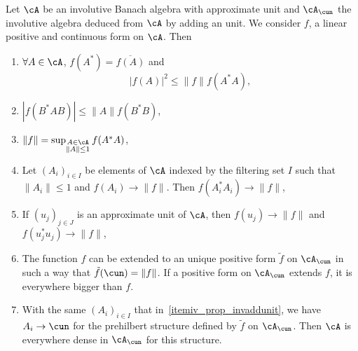 \begin{proposition}
	Let $\cA$ be an involutive Banach algebra with approximate unit and $\cA_{\cun}$ the involutive algebra deduced from $\cA$ by adding an unit. We consider $f$, a linear positive and continuous form on $\cA$. Then
	\begin{enumerate}
		\item \label{itemi_prop_invaddunit} $\forall A\in \cA$, $f(A^*)=\overline{ f(A) }$ and
		      \[
			      | f(A) |^2\leq \| f \|f(A^*A),
		      \]
		\item \label{itemii_prop_invaddunit} $| f(B^*AB) |\leq\| A \|f(B^*B)$,
		\item \label{itemiii_prop_invaddunit} $\| f \|=\sup_{\substack{A\in\cA\\\| A \|\leq1} } f(A^*A)$,
		\item \label{itemiv_prop_invaddunit} Let $(A_i)_{i\in I}$ be elements of $\cA$ indexed by the filtering set $I$ such that $\| A_i \|\leq 1$ and $f(A_i)\to\| f \|$. Then $f(A^*_iA_i)\to\| f \|$,
		\item \label{itemv_prop_invaddunit} If $(u_j)_{j\in J}$ is an approximate unit of $\cA$, then $f(u_j)\to \| f \|$ and $f(u_j^*u_j)\to\| f \|$,
		\item \label{itemvi_prop_invaddunit} The function $f$ can be extended to an unique positive form $\tilde f$ on $\cA_{\cun}$ in such a way that $\tilde f(\cun)=\| f \|$. If a positive form on $\cA_{\cun}$ extends $f$, it is everywhere bigger than $f$.
		\item \label{itemvii_prop_invaddunit} With the same $(A_i)_{i\in I}$ that in~\ref{itemiv_prop_invaddunit}, we have $A_i\to\cun$ for the prehilbert structure defined by $\tilde f$ on $\cA_{\cun}$. Then $\cA$ is everywhere dense in $\cA_{\cun}$ for this structure.
	\end{enumerate}

	\label{prop_invaddunit}
\end{proposition}

